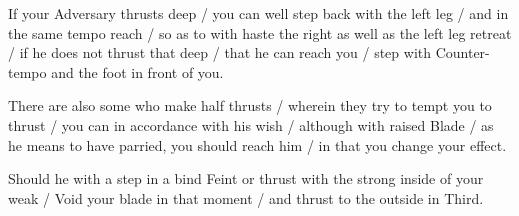 If your Adversary thrusts deep / you can well step back with the left
leg / and in the same tempo reach / so as to with haste the right as
well as the left leg retreat / if he does not thrust that deep /
that he can reach you / step with Counter-tempo and the foot in front
of you.


There are also some who make half thrusts / wherein they try to tempt you
to thrust / you can in accordance with his wish / although with
raised Blade / as he means to have
parried, you should reach him / in that you change your effect.


Should he with a step in a bind Feint or thrust with the strong inside
of your weak / Void your blade in that moment / and thrust to the
outside in Third.

